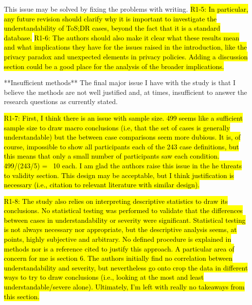 This issue may be solved by fixing the problems with writing. 
\hl{R1-5: In particular, any
future revision should clarify why it is important to investigate the
understandability of ToS;DR cases, beyond the fact that it is a
standard database.}
\hl{R1-6: The authors should also make it clear what these
results mean and what implications they have for the issues raised in
the introduction, like the privacy paradox and unexpected elements in
privacy policies.
Adding a discussion section could be a good place
for the analysis of the broader implications.}

**Insufficient  methods**
The final major issue I have with the study is that I believe the methods are not
well justified and, at times, insufficient to answer the research
questions as currently stated.

\hl{R1-7: First, I think there is an issue with sample size. 499 seems like a sufficient
sample size to draw macro conclusions (i.e, that the set of cases is
generally understandable) but the between case comparisons seem more
dubious.  It is, of course, impossible to show all participants each
of the 243 case definitions, but this means that only a small number
of participants saw each condition. 499/(243/5) = ~10 each. I am glad
the authors raise this issue in the he threats to validity section.
This design may be acceptable, but I think justification is necessary
(i.e., citation to relevant literature with similar design).}

\hl{R1-8: The study also relies on interpreting descriptive statistics to draw its
conclusions. No statistical testing was performed to validate that the
differences between cases in understandability or severity were
significant. Statistical testing is not always necessary nor
appropriate, but the descriptive analysis seems, at points, highly
subjective and arbitrary. No defined procedure is explained in methods
nor is a reference cited to justify this approach.  A particular area
of concern for me is section 6. The authors initially find no
correlation between understandability and severity, but nevertheless
go onto crop the data in different ways to try to draw conclusions
(i.e., looking at the most and least understandable/severe alone).
Ultimately, I'm left with really no takeaways from this section.}

